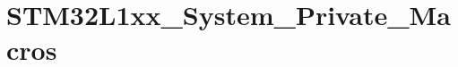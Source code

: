 \hypertarget{group___s_t_m32_l1xx___system___private___macros}{\section{S\-T\-M32\-L1xx\-\_\-\-System\-\_\-\-Private\-\_\-\-Macros}
\label{group___s_t_m32_l1xx___system___private___macros}
}
